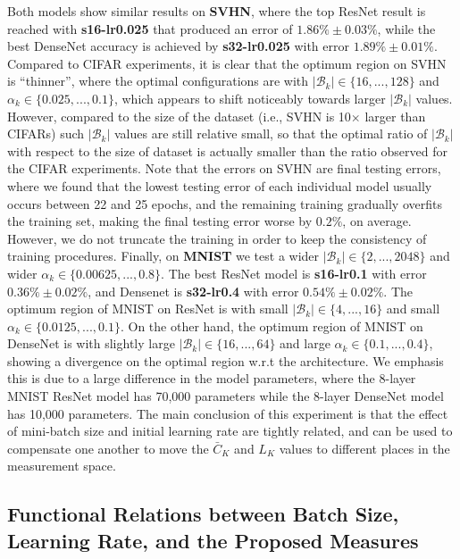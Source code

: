 \documentclass[10pt,journal,compsoc]{IEEEtran}
\begin{document}
Both models show similar results on {\bf SVHN}, where the top ResNet result is reached with {\bf s16-lr0.025} that produced an error of $1.86\%\pm0.03\%$, while the best DenseNet accuracy is achieved by {\bf s32-lr0.025} with error $1.89\%\pm0.01\%$. %
Compared to CIFAR experiments, it is clear that the optimum region on SVHN is ``thinner'', where 
the optimal configurations are with $|\mathcal{B}_k| \in \{ 16, ..., 128 \}$ and $\alpha_k \in \{ 0.025, ..., 0.1 \}$, which appears to shift noticeably towards larger $|\mathcal{B}_k|$ values.
However, compared to the size of the dataset (i.e., SVHN is 10$\times$ larger than CIFARs) such $|\mathcal{B}_k|$ values are still relative small, so that the optimal ratio of $|\mathcal{B}_k|$ with respect to the size of dataset is actually smaller than the ratio observed for the CIFAR experiments.
Note that the errors on SVHN are final testing errors, where we found that the lowest testing error of each individual model  usually occurs between 22 and 25 epochs, and the remaining training gradually overfits the training set, making the final testing error worse by $0.2\%$, on average.
However, we do not truncate the training in order to keep the consistency of training procedures.
Finally, on {\bf MNIST} we test a wider  $|\mathcal{B}_k| \in \{ 2, ..., 2048 \}$ and wider  $\alpha_k \in \{ 0.00625, ..., 0.8 \}$.
The best ResNet model is {\bf s16-lr0.1} with error $0.36\%\pm0.02\%$, and Densenet is {\bf s32-lr0.4} with error $0.54\%\pm0.02\%$.
The optimum region of MNIST on ResNet is with small $|\mathcal{B}_k| \in \{ 4, ..., 16 \}$ and small $\alpha_k \in \{ 0.0125, ..., 0.1 \}$.
On the other hand, the optimum region of MNIST on DenseNet is with slightly large $|\mathcal{B}_k| \in \{ 16, ..., 64 \}$ and large $\alpha_k \in \{ 0.1, ..., 0.4 \}$, showing a divergence on the optimal region w.r.t the architecture.
We emphasis this is due to a large difference in the model parameters, where the 8-layer MNIST ResNet model has 70,000 parameters while the 8-layer DenseNet model has 10,000 parameters.
The main conclusion of this experiment is that the effect of mini-batch size and initial learning rate are tightly related, and can be used to compensate one another to move the $\bar{C}_K$ and $L_K$ values to different places in the measurement space.



\subsection{Functional Relations between Batch Size, Learning Rate, and the Proposed Measures}
\end{document}
